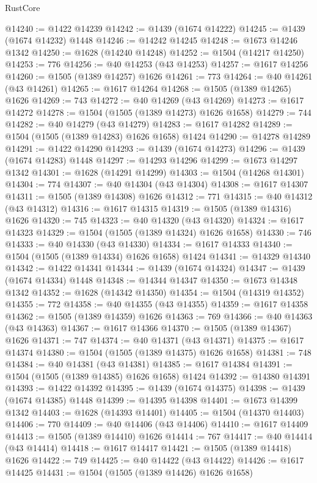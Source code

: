 \begin{lexlean}{RustCore}
\begin{coremodule}
@14240 := @1422 @14239
@14242 := @1439 (@1674 @14222)
@14245 := @1439 (@1674 @14232) @1448
@14246 := @14242 @14245
@14248 := @1673 @14246 @1342
@14250 := @1628 (@14240 @14248)
@14252 := @1504 (@14217 @14250)
@14253 := 776
@14256 := @40 @14253 (@43 @14253)
@14257 := @1617 @14256
@14260 := @1505 (@1389 @14257) @1626
@14261 := 773
@14264 := @40 @14261 (@43 @14261)
@14265 := @1617 @14264
@14268 := @1505 (@1389 @14265) @1626
@14269 := 743
@14272 := @40 @14269 (@43 @14269)
@14273 := @1617 @14272
@14278 := @1504 (@1505 (@1389 @14273) @1626 @1658)
@14279 := 744
@14282 := @40 @14279 (@43 @14279)
@14283 := @1617 @14282
@14289 := @1504 (@1505 (@1389 @14283) @1626 @1658) @1424
@14290 := @14278 @14289
@14291 := @1422 @14290
@14293 := @1439 (@1674 @14273)
@14296 := @1439 (@1674 @14283) @1448
@14297 := @14293 @14296
@14299 := @1673 @14297 @1342
@14301 := @1628 (@14291 @14299)
@14303 := @1504 (@14268 @14301)
@14304 := 774
@14307 := @40 @14304 (@43 @14304)
@14308 := @1617 @14307
@14311 := @1505 (@1389 @14308) @1626
@14312 := 771
@14315 := @40 @14312 (@43 @14312)
@14316 := @1617 @14315
@14319 := @1505 (@1389 @14316) @1626
@14320 := 745
@14323 := @40 @14320 (@43 @14320)
@14324 := @1617 @14323
@14329 := @1504 (@1505 (@1389 @14324) @1626 @1658)
@14330 := 746
@14333 := @40 @14330 (@43 @14330)
@14334 := @1617 @14333
@14340 := @1504 (@1505 (@1389 @14334) @1626 @1658) @1424
@14341 := @14329 @14340
@14342 := @1422 @14341
@14344 := @1439 (@1674 @14324)
@14347 := @1439 (@1674 @14334) @1448
@14348 := @14344 @14347
@14350 := @1673 @14348 @1342
@14352 := @1628 (@14342 @14350)
@14354 := @1504 (@14319 @14352)
@14355 := 772
@14358 := @40 @14355 (@43 @14355)
@14359 := @1617 @14358
@14362 := @1505 (@1389 @14359) @1626
@14363 := 769
@14366 := @40 @14363 (@43 @14363)
@14367 := @1617 @14366
@14370 := @1505 (@1389 @14367) @1626
@14371 := 747
@14374 := @40 @14371 (@43 @14371)
@14375 := @1617 @14374
@14380 := @1504 (@1505 (@1389 @14375) @1626 @1658)
@14381 := 748
@14384 := @40 @14381 (@43 @14381)
@14385 := @1617 @14384
@14391 := @1504 (@1505 (@1389 @14385) @1626 @1658) @1424
@14392 := @14380 @14391
@14393 := @1422 @14392
@14395 := @1439 (@1674 @14375)
@14398 := @1439 (@1674 @14385) @1448
@14399 := @14395 @14398
@14401 := @1673 @14399 @1342
@14403 := @1628 (@14393 @14401)
@14405 := @1504 (@14370 @14403)
@14406 := 770
@14409 := @40 @14406 (@43 @14406)
@14410 := @1617 @14409
@14413 := @1505 (@1389 @14410) @1626
@14414 := 767
@14417 := @40 @14414 (@43 @14414)
@14418 := @1617 @14417
@14421 := @1505 (@1389 @14418) @1626
@14422 := 749
@14425 := @40 @14422 (@43 @14422)
@14426 := @1617 @14425
@14431 := @1504 (@1505 (@1389 @14426) @1626 @1658)

\end{coremodule}
\end{lexlean}

